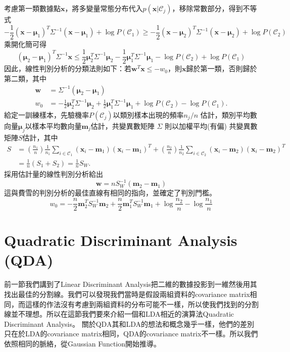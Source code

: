 \documentclass[12pt, a4paper]{article}
\begin{document}
考慮第一類數據點$\mathbf{x}$，將多變量常態分布代入$p(\mathbf{x}\vert\mathcal{C}_j)$，移除常數部分，得到不等式
$$\displaystyle  -\frac{1}{2}(\mathbf{x}-\boldsymbol{\mu}_1)^T\Sigma^{-1}(\mathbf{x}-\boldsymbol{\mu}_1)+\log P(\mathcal{C}_1)\ge -\frac{1}{2}(\mathbf{x}-\boldsymbol{\mu}_2)^T\Sigma^{-1}(\mathbf{x}-\boldsymbol{\mu}_2)+\log P(\mathcal{C}_2)$$
乘開化簡可得
$$\displaystyle  (\boldsymbol{\mu}_2-\boldsymbol{\mu}_1)^T\Sigma^{-1}\mathbf{x}\le\frac{1}{2}\boldsymbol{\mu}_2^T\Sigma^{-1}\boldsymbol{\mu}_2-\frac{1}{2}\boldsymbol{\mu}_1^T\Sigma^{-1}\boldsymbol{\mu}_1-\log P(\mathcal{C}_2)+\log P(\mathcal{C}_1)$$
因此，線性判別分析的分類法則如下：若$\mathbf{w}^T\mathbf{x}\le -w_0$，則$\mathbf{x}$歸於第一類，否則歸於第二類，其中
$$\displaystyle\begin{aligned}  \mathbf{w}&=\Sigma^{-1}(\boldsymbol{\mu}_2-\boldsymbol{\mu}_1)\\  w_0&=-\frac{1}{2}\boldsymbol{\mu}_2^T\Sigma^{-1}\boldsymbol{\mu}_2+\frac{1}{2}\boldsymbol{\mu}_1^T\Sigma^{-1}\boldsymbol{\mu}_1+\log P(\mathcal{C}_2)-\log P(\mathcal{C}_1).  \end{aligned}$$
給定一訓練樣本，先驗機率$P(\mathcal{C}_j)$以類別樣本出現的頻率$n_j/n$ 估計，類別平均數向量$\boldsymbol{\mu}_j$以樣本平均數向量$\mathbf{m}_j$估計，共變異數矩陣 $\Sigma$ 則以加權平均(有偏) 共變異數矩陣$S$估計，其中
$$\displaystyle\begin{aligned}  S&=\left(\frac{n_1}{n}\right)\frac{1}{n_1}\sum_{i\in\mathcal{C}_1}(\mathbf{x}_i-\mathbf{m}_1)(\mathbf{x}_i-\mathbf{m}_1)^T+\left(\frac{n_2}{n}\right)\frac{1}{n_2}\sum_{i\in\mathcal{C}_2}(\mathbf{x}_i-\mathbf{m}_2)(\mathbf{x}_i-\mathbf{m}_2)^T\\  &=\frac{1}{n}(S_1+S_2)=\frac{1}{n}S_W.\end{aligned}$$
採用估計量的線性判別分析給出
$$\displaystyle  \mathbf{w}=nS_W^{-1}(\mathbf{m}_2-\mathbf{m}_1)$$
這與費雪的判別分析的最佳直線有相同的指向，並確定了判別門檻。
$$\displaystyle  w_0=-\frac{n}{2}\mathbf{m}_2^TS_W^{-1}\mathbf{m}_2+\frac{n}{2}\mathbf{m}_1^TS_W^{-1}\mathbf{m}_1+\log \frac{n_2}{n}-\log \frac{n_1}{n}$$
 

\section{Quadratic Discriminant Analysis (QDA)}
前一節我們講到了Linear Discriminant Analysis把二維的數據投影到一維然後用其找出最佳的分割線。我們可以發現我們當時是假設兩組資料的covariance matrix相同，而這樣的作法沒有考慮到兩組資料的分布可能不一樣，所以使我們找到的分割線並不理想。所以在這節我們要來介紹一個和LDA相近的演算法Quadratic Discriminant Analysis。
關於QDA其和LDA的想法和概念幾乎一樣，他們的差別只在於LDA的covariance matrix相同，QDA的covariance matrix不一樣。所以我們依照相同的脈絡，從Gaussian Function開始推導。
\end{document}
